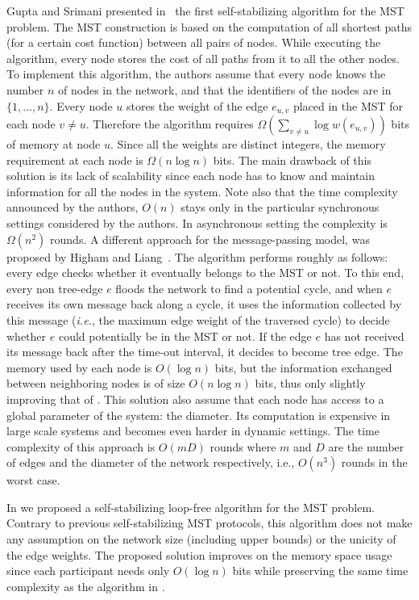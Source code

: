 \documentclass[11pt,a4paper]{article}
\begin{document}
Gupta and Srimani presented in~\cite{AntonoiuS97} the first self-stabilizing algorithm for the MST problem. 
The MST construction is based on the computation of all 
shortest paths (for a certain cost function) 
between all pairs of nodes. While executing the algorithm, every node stores the cost of 
all paths from it to all the other nodes. To implement this algorithm, the authors assume that every node knows the number $n$ of nodes in 
the network, and that the identifiers of the nodes are in $\{1,\dots,n\}$. Every node $u$ stores the weight of the edge $e_{u,v}$ placed in the 
MST for each node $v\neq u$. Therefore the algorithm requires $\Omega(\sum_{v\neq u}\log w(e_{u,v}))$ bits of memory at node $u$. Since all 
the weights are distinct integers, the memory requirement at each node is $\Omega(n\log n)$ bits.
The main drawback of this solution is its lack of scalability since each node has to know and maintain information for all the nodes in the system. 
Note also that the time complexity announced by the authors, $O(n)$
stays only in the particular synchronous settings considered by the
authors. In asynchronous setting the complexity is $\Omega(n^2)$ rounds.
A different approach for the message-passing model, was proposed by 
Higham and Liang~\cite{HighamL01}. 
The algorithm performs roughly as follows: every edge checks 
whether it eventually belongs to the MST or not. 
To this end, every non tree-edge $e$ floods the network to find 
a potential cycle, and when $e$ receives its own message back along a cycle, it uses the information collected by this message (\emph{i.e.}, 
the maximum edge weight of the traversed cycle) to decide whether $e$ could potentially be in the MST or not. If the edge $e$ has not 
received its message back after the time-out interval, it decides to become tree edge. The memory used by each node is $O(\log n)$ bits, but the information exchanged between neighboring nodes is of size $O(n \log n)$ bits, 
thus only slightly improving that of \cite{AntonoiuS97}. This solution
also assume that each node has 
access to a global parameter of the system: the diameter. Its
computation 
is expensive in large scale systems and becomes even harder in dynamic settings.
The time complexity of this approach is $O(mD)$ rounds where $m$ and $D$ are the number of edges and the diameter of the network respectively, i.e., $O(n^3)$ rounds in the worst case.


In \cite{BPRT09c} we proposed a  self-stabilizing loop-free algorithm for the MST problem. 
Contrary to previous self-stabilizing MST protocols, this algorithm does not make
any assumption on the network size (including upper bounds) or the unicity of the
edge weights. The proposed solution improves on the memory space usage since each
participant needs only $O(\log n)$ bits while preserving the same time complexity as the algorithm in \cite{HighamL01}.  
\end{document}
